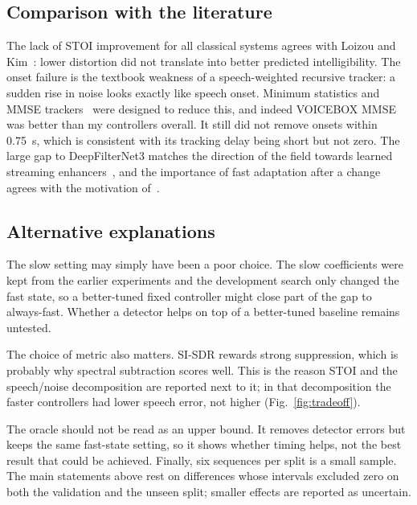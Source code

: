 \documentclass[10pt,conference,a4paper]{IEEEtran}
\begin{document}
\subsection{Comparison with the literature}
The lack of STOI improvement for all classical systems agrees with Loizou and
Kim~\cite{loizou2011reasons}: lower distortion did not translate into better
predicted intelligibility. The onset failure is the textbook weakness of a
speech-weighted recursive tracker: a sudden rise in noise looks exactly like
speech onset. Minimum statistics and MMSE trackers~\cite{martin2001noise,gerkmann2012unbiased}
were designed to reduce this, and indeed VOICEBOX MMSE was better than my
controllers overall. It still did not remove onsets within 0.75~s, which is
consistent with its tracking delay being short but not zero. The large gap to
DeepFilterNet3 matches the direction of the field towards learned streaming
enhancers~\cite{schroter2023deepfilternet}, and the importance of fast
adaptation after a change agrees with the motivation of~\cite{cheng2026lightweight}.

\subsection{Alternative explanations}
The slow setting may simply have been a poor choice. The slow coefficients were
kept from the earlier experiments and the development search only changed the
fast state, so a better-tuned fixed controller might close part of the gap to
always-fast. Whether a detector helps on top of a better-tuned baseline remains
untested.

The choice of metric also matters. SI-SDR rewards strong suppression, which is
probably why spectral subtraction scores well. This is the reason STOI and the
speech/noise decomposition are reported next to it; in that decomposition the
faster controllers had lower speech error, not higher
(Fig.~\ref{fig:tradeoff}).

The oracle should not be read as an upper bound. It removes detector errors but
keeps the same fast-state setting, so it shows whether timing helps, not the
best result that could be achieved. Finally, six sequences per split is a small
sample. The main statements above rest on differences whose intervals excluded
zero on both the validation and the unseen split; smaller effects are reported
as uncertain.
\end{document}
